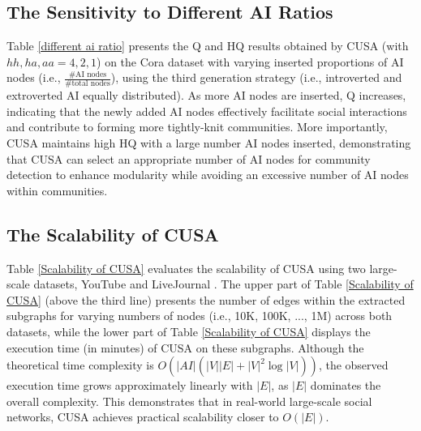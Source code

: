 \subsection{The Sensitivity to Different AI Ratios}
\label{Sensitivity to Different AI Ratios}
Table \ref{different ai ratio} presents the Q and HQ results obtained by CUSA (with $hh, ha, aa = 4,2,1$) on the Cora dataset with varying inserted proportions of AI nodes (i.e., $\frac{\text{\# AI nodes}}{\text{\# total nodes}}$), using the third generation strategy (i.e., introverted and extroverted AI equally distributed). As more AI nodes are inserted, Q increases, indicating that the newly added AI nodes effectively facilitate social interactions and contribute to forming more tightly-knit communities. More importantly, CUSA maintains high HQ with a large number AI nodes inserted, demonstrating that CUSA can select an appropriate number of AI nodes for community detection to enhance modularity while avoiding an excessive number of AI nodes within communities.


\subsection{The Scalability of CUSA}

Table \ref{Scalability of CUSA} evaluates the scalability of CUSA using two large-scale datasets, YouTube \cite{yang2012defining} and LiveJournal \cite{yang2012defining}. The upper part of Table \ref{Scalability of CUSA} (above the third line) presents the number of edges within the extracted subgraphs for varying numbers of nodes (i.e., 10K, 100K, ..., 1M) across both datasets, while the lower part of Table \ref{Scalability of CUSA} displays the execution time (in minutes) of CUSA on these subgraphs. Although the theoretical time complexity is $O(|AI|(|V||E| + |V|^2 \log |V|))$, the observed execution time grows approximately linearly with $|E|$, as $|E|$ dominates the overall complexity. This demonstrates that in real-world large-scale social networks, CUSA achieves practical scalability closer to $O(|E|)$. 

